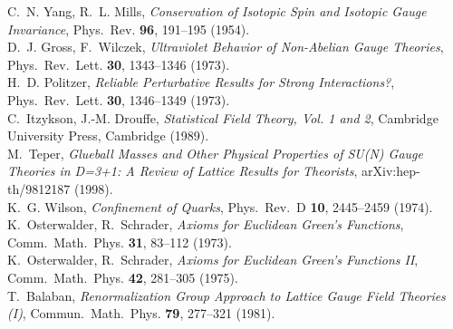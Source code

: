 \begin{thebibliography}{99}
	
	C.~N. Yang, R.~L. Mills,
	\textit{Conservation of Isotopic Spin and Isotopic Gauge Invariance},
	Phys.~Rev. \textbf{96}, 191--195 (1954).
	\\[-0.75em]
	
	D.~J. Gross, F.~Wilczek,
	\textit{Ultraviolet Behavior of Non-Abelian Gauge Theories},
	Phys.~Rev.~Lett. \textbf{30}, 1343--1346 (1973).
	\\[-0.75em]
	
	H.~D. Politzer,
	\textit{Reliable Perturbative Results for Strong Interactions?},
	Phys.~Rev.~Lett. \textbf{30}, 1346--1349 (1973).
	\\[-0.75em]
	
	C.~Itzykson, J.-M. Drouffe,
	\textit{Statistical Field Theory, Vol. 1 and 2},
	Cambridge University Press, Cambridge (1989).
	\\[-0.75em]
	
	M.~Teper,
	\textit{Glueball Masses and Other Physical Properties of SU(N) Gauge Theories in D=3+1: A Review of Lattice Results for Theorists},
	arXiv:hep-th/9812187 (1998).
	\\[-0.75em]
	
	K.~G. Wilson,
	\textit{Confinement of Quarks},
	Phys.~Rev.~D \textbf{10}, 2445--2459 (1974).
	\\[-0.75em]
	
	K.~Osterwalder, R.~Schrader,
	\textit{Axioms for Euclidean Green's Functions},
	Comm.~Math.~Phys. \textbf{31}, 83--112 (1973).
	\\[-0.75em]
	
	K.~Osterwalder, R.~Schrader,
	\textit{Axioms for Euclidean Green's Functions II},
	Comm.~Math.~Phys. \textbf{42}, 281--305 (1975).
	\\[-0.75em]
	
	T.~Balaban,
	\textit{Renormalization Group Approach to Lattice Gauge Field Theories (I)},
	Commun.~Math.~Phys. \textbf{79}, 277--321 (1981).
	\\[-0.75em]
	

\end{thebibliography}
